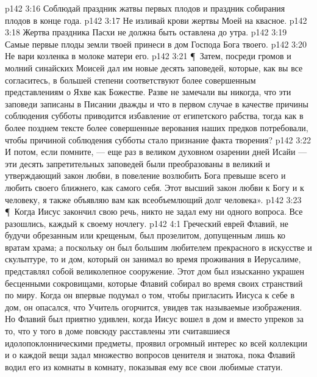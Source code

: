 \vs p142 3:16 \bibnobreakspace Соблюдай праздник жатвы первых плодов и праздник собирания плодов в конце года.
\vs p142 3:17 \bibnobreakspace Не изливай крови жертвы Моей на квасное.
\vs p142 3:18 \bibnobreakspace Жертва праздника Пасхи не должна быть оставлена до утра.
\vs p142 3:19 \bibnobreakspace Самые первые плоды земли твоей принеси в дом Господа Бога твоего.
\vs p142 3:20 \bibnobreakspace Не вари козленка в молоке матери его.
\vs p142 3:21 \P\ Затем, посреди громов и молний синайских Моисей дал им новые десять заповедей, которые, как вы все согласитесь, в большей степени соответствуют более совершенным представлениям о Яхве как Божестве. Разве не замечали вы никогда, что эти заповеди записаны в Писании дважды и что в первом случае в качестве причины соблюдения субботы приводится избавление от египетского рабства, тогда как в более позднем тексте более совершенные верования наших предков потребовали, чтобы причиной соблюдения субботы стало признание факта творения?
\vs p142 3:22 И потом, если помните, --- еще раз в великом духовном озарении дней Исайи --- эти десять запретительных заповедей были преобразованы в великий и утверждающий закон любви, в повеление возлюбить Бога превыше всего и любить своего ближнего, как самого себя. Этот высший закон любви к Богу и к человеку, я также объявляю вам как всеобъемлющий долг человека».
\vs p142 3:23 \P\ Когда Иисус закончил свою речь, никто не задал ему ни одного вопроса. Все разошлись, каждый к своему ночлегу.
\vs p142 4:1 Греческий еврей Флавий, не будучи обрезанным или крещеным, был прозелитом, допущенным лишь ко вратам храма; а поскольку он был большим любителем прекрасного в искусстве и скульптуре, то и дом, который он занимал во время проживания в Иерусалиме, представлял собой великолепное сооружение. Этот дом был изысканно украшен бесценными сокровищами, которые Флавий собирал во время своих странствий по миру. Когда он впервые подумал о том, чтобы пригласить Иисуса к себе в дом, он опасался, что Учитель огорчится, увидев так называемые изображения. Но Флавий был приятно удивлен, когда Иисус вошел в дом и вместо упреков за то, что у того в доме повсюду расставлены эти считавшиеся идолопоклонническими предметы, проявил огромный интерес ко всей коллекции и о каждой вещи задал множество вопросов ценителя и знатока, пока Флавий водил его из комнаты в комнату, показывая ему все свои любимые статуи.
